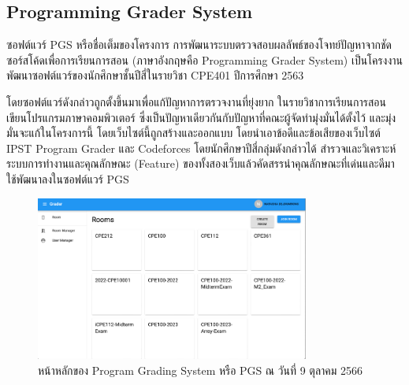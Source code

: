 \documentclass[12pt,one side,openright,a4paper]{cpe-thesis-th}
\newcommand{\thaijustify}[1]{%
  \par\hspace{30pt}\justifying
  #1
}
\begin{document}
        \pagebreak
    \subsection{Programming Grader System}
        \thaijustify{
            ซอฟต์แวร์ PGS หรือชื่อเต็มของโครงการ การพัฒนาระบบตรวจสอบผลลัพธ์ของโจทย์ปัญหาจากชัดซอร์สโค้ดเพื่อการเรียนการสอน (ภาษาอังกฤษคือ Programming Grader System) เป็นโครงงานพัฒนาซอฟต์แวร์ของนักศึกษาชั้นปีสี่ในรายวิชา CPE401 ปีการศึกษา 2563~\cite{nattawat20pgs}
        }
        \thaijustify{
            โดยซอฟต์แวร์ดังกล่าวถูกตั้งขึ้นมาเพื่อแก้ปัญหาการตรวจงานที่ยุ่งยาก ในรายวิชาการเรียนการสอนเขียนโปรแกรมภาษาคอมพิวเตอร์ ซึ่งเป็นปัญหาเดียวกันกับปัญหาที่คณะผู้จัดทำมุ่งมั่นได้ตั้งไว้ และมุ่งมั่นจะแก้ในโครงการนี้ โดยเว็บไซต์นี้ถูกสร้างและออกแบบ โดยนำเอาข้อดีและข้อเสียของเว็บไซต์ IPST Program Grader และ Codeforces โดยนักศึกษาปีสี่กลุ่มดังกล่าวได้ สำรวจและวิเคราะห์ระบบการทำงานและคุณลักษณะ (Feature) ของทั้งสองเว็บแล้วคัดสรรนำคุณลักษณะที่เด่นและดีมาใช้พัฒนาลงในซอฟต์แวร์ PGS
        }
        \begin{figure}[H]
            \centering
            \includegraphics[width=9cm]{figure/literature/pgs.png}
            \caption[หน้าหลักของ Program Grading System]{หน้าหลักของ Program Grading System หรือ PGS ณ วันที่ 9 ตุลาคม 2566}\label{fig:pgs-page}
        \end{figure}
        
\end{document}
